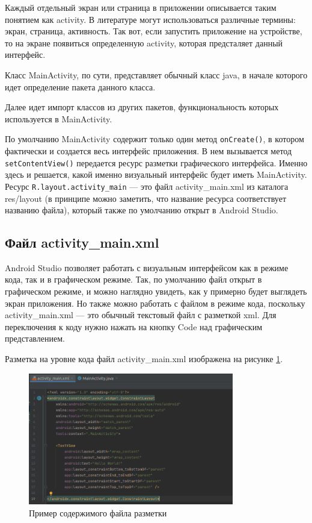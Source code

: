 Каждый отдельный экран или страница в приложении описывается таким
понятием как activity. В литературе могут использоваться различные
термины: экран, страница, активность.
Так вот, если запустить приложение на устройстве, то на экране появиться
определенную activity, которая предсталяет данный интерфейс.\par
Класс MainActivity, по сути, представляет обычный класс java, в начале
которого идет определение пакета данного класса.\par
Далее идет импорт классов из других пакетов, функциональность которых
используется в MainActivity.\par
По умолчанию MainActivity содержит только один метод \texttt{onCreate()}, в
котором фактически и создается весь интерфейс приложения.
В нем вызывается метод \texttt{setContentView()} передается ресурс разметки
графического интерфейса.
Именно здесь и решается, какой именно визуальный интерфейс будет иметь
MainActivity. Ресурс \texttt{R.layout.activity\_main} --- это файл
activity\_main.xml из каталога res/layout (в
принципе можно заметить, что название ресурса соответствует названию
файла), который также по умолчанию открыт в Android Studio.

\subsection{Файл activity\_main.xml}
Android Studio позволяет работать с визуальным интерфейсом как в режиме
кода, так и в графическом режиме. Так, по умолчанию файл открыт в
графическом режиме, и можно наглядно увидеть, как у примерно
будет выглядеть экран приложения.
Но также можно работать с файлом в режиме кода, поскольку
activity\_main.xml --- это обычный текстовый файл с разметкой xml. Для
переключения к коду нужно нажать на кнопку Code над графическим
представлением.\par
Разметка на уровне кода файл activity\_main.xml изображена
на рисунке \ref{fig:xml:layout}.

\begin{figure}[h!tp]
	\centering
	\includegraphics[width=0.8\textwidth]{Screenshot from 2023-03-09 17-29-58.png}
	\caption{Пример содержимого файла разметки}
	\label{fig:xml:layout}
\end{figure}

